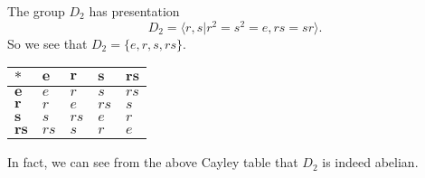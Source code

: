 \begin{example}
    The group $D_2$ has presentation
    \[
        D_2 = \langle r, s \vert r^2 = s^2 = e, rs = sr \rangle.
    \]
    So we see that $D_2 = \{e, r, s, rs\}$.
    
    \begin{table}[h]
        \centering
        \begin{tabular}{|l|l|l|l|l|}
            \hline
            $\boldsymbol{\ast}$ & $\boldsymbol{e}$ & $\boldsymbol{r}$ & $\boldsymbol{s}$ & $\boldsymbol{rs}$ \\ \hline
            $\boldsymbol{e}$    & $e$              & $r$              & $s$              & $rs$              \\ \hline
            $\boldsymbol{r}$    & $r$              & $e$              & $rs$             & $s$               \\ \hline
            $\boldsymbol{s}$    & $s$              & $rs$             & $e$              & $r$               \\ \hline
            $\boldsymbol{rs}$   & $rs$             & $s$              & $r$              & $e$               \\ \hline
        \end{tabular}
    \end{table}
    
    In fact, we can see from the above Cayley table that $D_2$ is indeed abelian.
\end{example}

